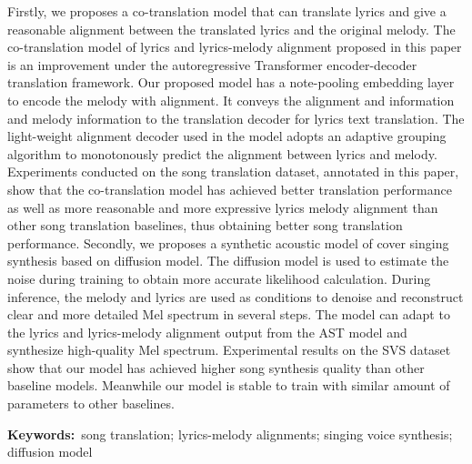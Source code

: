 Firstly, we proposes a co-translation model that can translate lyrics and give a reasonable alignment between the translated lyrics and the original melody. The co-translation model of lyrics and lyrics-melody alignment proposed in this paper is an improvement under the autoregressive Transformer encoder-decoder translation framework. Our proposed model has a note-pooling embedding layer to encode the melody with alignment. It conveys the alignment and information and melody information to the translation decoder for lyrics text translation. The light-weight alignment decoder used in the model adopts an adaptive grouping algorithm to monotonously predict the alignment between lyrics and melody. Experiments conducted on the song translation dataset, annotated in this paper, show that the co-translation model has achieved better translation performance as well as more reasonable and more expressive lyrics melody alignment than other song translation baselines, thus obtaining better song translation performance.
Secondly, we proposes a synthetic acoustic model of cover singing synthesis based on diffusion model. The diffusion model is used to estimate the noise during training to obtain more accurate likelihood calculation. During inference, the melody and lyrics are used as conditions to denoise and reconstruct clear and more detailed Mel spectrum in several steps. The model can adapt to the lyrics and lyrics-melody alignment output from the AST model and synthesize high-quality Mel spectrum. Experimental results on the SVS dataset show that our model has achieved higher song synthesis quality than other baseline models. Meanwhile our model is stable to train with similar amount of parameters to other baselines.

\noindent\textbf{Keywords:}~song translation; lyrics-melody alignments; singing voice synthesis; diffusion model

